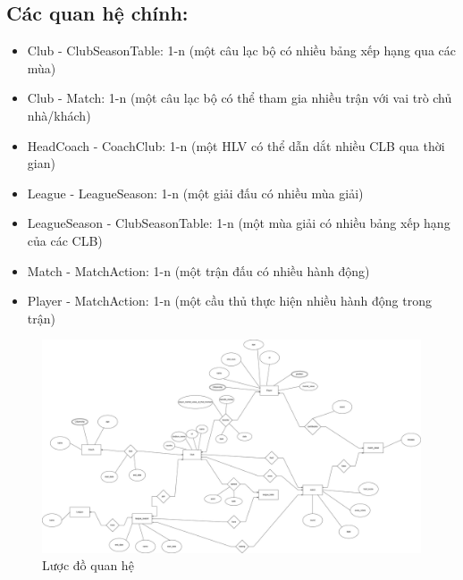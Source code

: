\documentclass[../BTL.tex]{subfiles}
\begin{document}
\subsection{Các quan hệ chính:}
\begin{itemize}
    \item Club - ClubSeasonTable: 1-n (một câu lạc bộ có nhiều bảng xếp hạng qua các mùa)
    \item Club - Match: 1-n (một câu lạc bộ có thể tham gia nhiều trận với vai trò chủ nhà/khách)
    \item HeadCoach - CoachClub: 1-n (một HLV có thể dẫn dắt nhiều CLB qua thời gian)
    \item League - LeagueSeason: 1-n (một giải đấu có nhiều mùa giải)
    \item LeagueSeason - ClubSeasonTable: 1-n (một mùa giải có nhiều bảng xếp hạng của các CLB)
    \item Match - MatchAction: 1-n (một trận đấu có nhiều hành động)
    \item Player - MatchAction: 1-n (một cầu thủ thực hiện nhiều hành động trong trận)
\end{itemize}
\begin{figure}
    \centering
    \includegraphics[width=1\linewidth]{Hinhve/relation-schema.jpg}
    \caption{Lược đồ quan hệ}
    \label{fig:relation-schema}
\end{figure}
\end{document}
